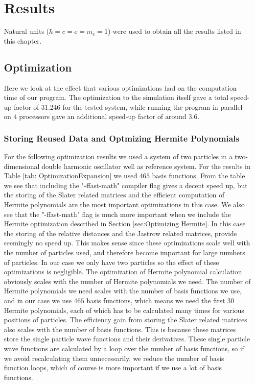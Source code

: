 \documentclass[../main.tex]{subfiles}
\begin{document}
\chapter{Results}

Natural units ($\hbar=c=e=m_e=1$) were used to obtain all the results listed in this chapter.

\section{Optimization}

Here we look at the effect that various optimizations had on the computation time of our program. The optimization to the simulation itself gave a total speed-up factor of $31.246$ for the tested system, while running the program in parallel on $4$ processors gave an additional speed-up factor of around $3.6$.

\subsection{Storing Reused Data and Optmizing Hermite Polynomials}

For the following optimization results we used a system of two particles in a two-dimensional double harmonic oscillator well as reference system. For the results in Table \ref{tab: OptimizationExpansion} we used $465$ basis functions. From the table we see that including the "-ffast-math" compiler flag gives a decent speed up, but the storing of the Slater related matrices and the efficient computation of Hermite polynomials are the most important optimizations in this case. We also see that the "-ffast-math" flag is much more important when we include the Hermite optimization described in Section \ref{sec:Optimizing Hermite}. In this case the storing of the relative distances and the Jastrow related matrices, provide seemingly no speed up. This makes sense since these optimizations scale well with the number of particles used, and therefore become important for large numbers of particles. In our case we only have two particles so the effect of these optimizations is negligible. The optimization of Hermite polynomial calculation obviously scales with the number of Hermite polynomials we need. The number of Hermite polynomials we need scales with the number of basis functions we use, and in our case we use $465$ basis functions, which means we need the first $30$ Hermite polynomials, each of which has to be calculated many times for various positions of particles. The efficiency gain from storing the Slater related matrices also scales with the number of basis functions. This is because these matrices store the single particle wave functions and their derivatives. These single particle wave functions are calculated by a loop over the number of basis functions, so if we avoid recalculating them unnecessarily, we reduce the number of basis function loops, which of course is more important if we use a lot of basis functions.
\end{document}
